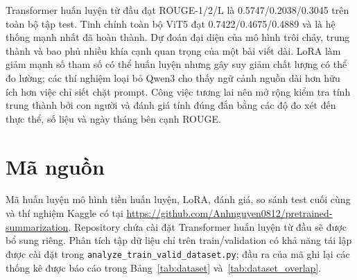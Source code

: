 \documentclass[conference]{IEEEtran}
\begin{document}
Transformer huấn luyện từ đầu đạt ROUGE-1/2/L là 0.5747/0.2038/0.3045 trên toàn bộ tập test. Tinh chỉnh toàn bộ ViT5 đạt 0.7422/0.4675/0.4889 và là hệ thống mạnh nhất đã hoàn thành. Dự đoán đại diện của mô hình trôi chảy, trung thành và bao phủ nhiều khía cạnh quan trọng của một bài viết dài. LoRA làm giảm mạnh số tham số có thể huấn luyện nhưng gây suy giảm chất lượng có thể đo lường; các thí nghiệm loại bỏ Qwen3 cho thấy ngữ cảnh nguồn dài hơn hữu ích hơn việc chỉ siết chặt prompt. Công việc tương lai nên mở rộng kiểm tra tính trung thành bởi con người và đánh giá tính đúng đắn bằng các độ đo xét đến thực thể, số liệu và ngày tháng bên cạnh ROUGE.

\section*{Mã nguồn}
Mã huấn luyện mô hình tiền huấn luyện, LoRA, đánh giá, so sánh test cuối cùng và thí nghiệm Kaggle có tại \url{https://github.com/Anhnguyen0812/pretrained-summarization}. Repository chứa cài đặt Transformer huấn luyện từ đầu sẽ được bổ sung riêng. Phân tích tập dữ liệu chỉ trên train/validation có khả năng tái lập được cài đặt trong \texttt{analyze\_train\_valid\_dataset.py}; đầu ra của mã ghi lại các thống kê được báo cáo trong Bảng~\ref{tab:dataset} và~\ref{tab:dataset_overlap}.
\end{document}
